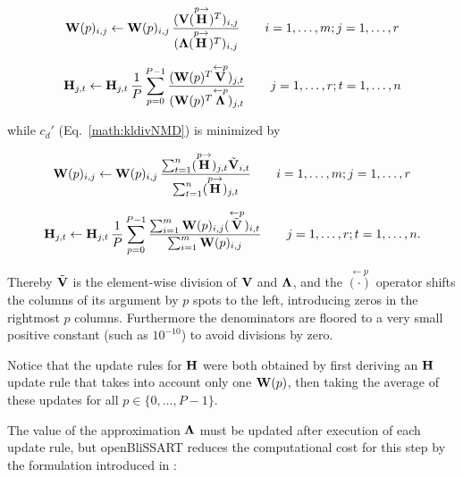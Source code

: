 \begin{equation}
    \label{math:EDWUpdateRuleNMD}
    \mathbf{W}(p)_{i,j} \leftarrow \mathbf{W}(p)_{i,j} \,
    \frac{( \mathbf{V}(\overset{p\rightarrow}{\mathbf{H}})^T )_{i,j}}
         {( \mathbf{\Lambda}(\overset{p\rightarrow}{\mathbf{H}})^T )_{i,j}}
    \qquad
     i = 1, \dots, m; j = 1, \dots, r
\end{equation}

\begin{equation}
    \label{math:EDHUpdateRuleNMD}
    \mathbf{H}_{j,t} \leftarrow \mathbf{H}_{j,t} \, \frac{1}{P} \sum\limits_{p=0}^{P-1} 
    \frac{( \mathbf{W}(p)^T \overset{\leftarrow p}{\mathbf{V}} )_{j,t}}
         {( \mathbf{W}(p)^T \overset{\leftarrow p}{\mathbf{\Lambda}} )_{j,t}}
    \qquad
    j = 1, \dots, r; t = 1, \dots, n
\end{equation}

\noindent while $c_d'$ (Eq.~\ref{math:kldivNMD}) is minimized by

\begin{equation}
    \label{math:KLWUpdateRuleNMD}
    \mathbf{W}(p)_{i,j} \leftarrow \mathbf{W}(p)_{i,j} \,
    \frac{\sum_{t=1}^n (\overset{p\rightarrow}{\mathbf{H}})_{j,t} \tilde{\mathbf{V}}_{i,t}}
         {\sum_{t=1}^n (\overset{p\rightarrow}{\mathbf{H}})_{j,t}}
    \qquad
     i = 1, \dots, m; j = 1, \dots, r 
\end{equation}

\begin{equation}
    \label{math:KLHUpdateRuleNMD}
    \mathbf{H}_{j,t} \leftarrow \mathbf{H}_{j,t} \, \frac{1}{P} \sum\limits_{p=0}^{P-1} 
    \frac{\sum_{i=1}^m \mathbf{W}(p)_{i,j} (\overset{\leftarrow p}{\tilde{\mathbf{V}}})_{i,t}}
         {\sum_{i=1}^m \mathbf{W}(p)_{i,j}}
    \qquad
    j = 1, \dots, r; t = 1, \dots, n .
\end{equation}

Thereby $\tilde{\mathbf{V}}$ is the element-wise division of $\mathbf{V}$ and
$\mathbf{\Lambda}$, and the $\overset{\leftarrow p}{(\cdot)}$ operator shifts the
columns of its argument by $p$ spots to the left, introducing zeros in the
rightmost $p$ columns. Furthermore the denominators are floored to a very small
positive constant (such as $10^{-10}$) to avoid divisions by zero.

Notice that the update rules for $\mathbf{H}$ were both obtained by first deriving
an $\mathbf{H}$ update rule that takes into account only one $\mathbf{W}(p)$, then
taking the average of these updates for all $p \in \{0, \dots, P-1\}$. 

The value of the approximation $\mathbf{\Lambda}$ must be updated after execution
of each update rule, but openBliSSART reduces the computational cost for this step by the formulation introduced in \cite{WangNMD2009}:

